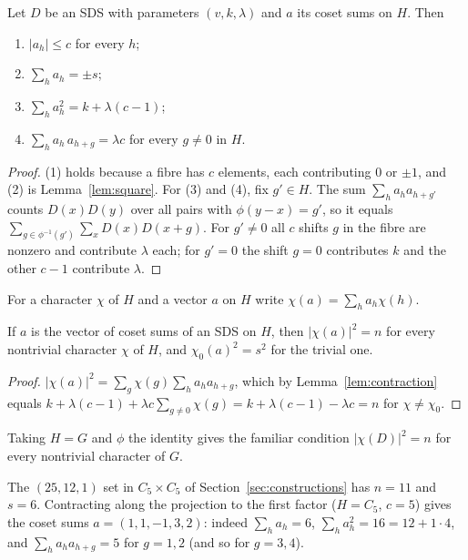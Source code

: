 \begin{lemma}\label{lem:contraction}
Let $D$ be an SDS with parameters $(v,k,\lambda)$ and $a$ its coset sums on $H$. Then
\begin{enumerate}
\item $|a_h| \le c$ for every $h$;
\item $\sum_h a_h = \pm s$;
\item $\sum_h a_h^2 = k + \lambda(c-1)$;
\item $\sum_h a_h\, a_{h+g} = \lambda c$ for every $g \neq 0$ in $H$.
\end{enumerate}
\end{lemma}

\begin{proof}
(1) holds because a fibre has $c$ elements, each contributing $0$ or $\pm1$, and (2) is
Lemma~\ref{lem:square}. For (3) and (4), fix $g' \in H$. The sum $\sum_h a_h a_{h+g'}$ counts
$D(x) D(y)$ over all pairs with $\phi(y - x) = g'$, so it equals $\sum_{g \in \phi^{-1}(g')}
\sum_x D(x) D(x+g)$. For $g' \neq 0$ all $c$ shifts $g$ in the fibre are nonzero and contribute
$\lambda$ each; for $g' = 0$ the shift $g = 0$ contributes $k$ and the other $c - 1$ contribute
$\lambda$.
\end{proof}

For a character $\chi$ of $H$ and a vector $a$ on $H$ write $\chi(a) = \sum_h a_h \chi(h)$.

\begin{lemma}\label{lem:chars}
If $a$ is the vector of coset sums of an SDS on $H$, then $|\chi(a)|^2 = n$ for every nontrivial
character $\chi$ of $H$, and $\chi_0(a)^2 = s^2$ for the trivial one.
\end{lemma}

\begin{proof}
$|\chi(a)|^2 = \sum_{g} \chi(g) \sum_h a_h a_{h+g}$, which by Lemma~\ref{lem:contraction} equals
$k + \lambda(c-1) + \lambda c \sum_{g \neq 0} \chi(g) = k + \lambda(c - 1) - \lambda c = n$ for
$\chi \neq \chi_0$.
\end{proof}

Taking $H = G$ and $\phi$ the identity gives the familiar condition $|\chi(D)|^2 = n$ for every
nontrivial character of $G$.

\begin{example}\label{ex:coset}
The $(25,12,1)$ set in $C_5 \times C_5$ of Section~\ref{sec:constructions} has $n = 11$ and
$s = 6$. Contracting along the projection to the first factor ($H = C_5$, $c = 5$) gives the
coset sums $a = (1, 1, -1, 3, 2)$: indeed $\sum_h a_h = 6$, $\sum_h a_h^2 = 16 = 12 + 1 \cdot 4$,
and $\sum_h a_h a_{h+g} = 5$ for $g = 1, 2$ (and so for $g = 3, 4$).
\end{example}

